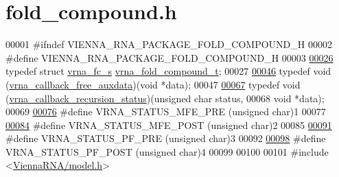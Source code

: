\hypertarget{fold__compound_8h_source}{}\section{fold\+\_\+compound.\+h}
\label{fold__compound_8h_source}

\begin{DoxyCode}
00001 \textcolor{preprocessor}{#ifndef VIENNA\_RNA\_PACKAGE\_FOLD\_COMPOUND\_H}
00002 \textcolor{preprocessor}{#define VIENNA\_RNA\_PACKAGE\_FOLD\_COMPOUND\_H}
00003 
\mbox{\hyperlink{group__fold__compound_ga1b0cef17fd40466cef5968eaeeff6166}{00026}} \textcolor{keyword}{typedef} \textcolor{keyword}{struct }\mbox{\hyperlink{group__fold__compound_structvrna__fc__s}{vrna\_fc\_s}} \mbox{\hyperlink{group__fold__compound_structvrna__fc__s}{vrna\_fold\_compound\_t}};
00027 
\mbox{\hyperlink{group__fold__compound_ga7806651f51b195013839a218b3bbd5a3}{00046}} \textcolor{keyword}{typedef} void (\mbox{\hyperlink{group__fold__compound_ga7806651f51b195013839a218b3bbd5a3}{vrna\_callback\_free\_auxdata}})(\textcolor{keywordtype}{void} *data);
00047 
\mbox{\hyperlink{group__fold__compound_gac86036fa8cad1108832335063243cdc8}{00067}} \textcolor{keyword}{typedef} void (\mbox{\hyperlink{group__fold__compound_gac86036fa8cad1108832335063243cdc8}{vrna\_callback\_recursion\_status}})(\textcolor{keywordtype}{unsigned} \textcolor{keywordtype}{char} status,
00068                                               \textcolor{keywordtype}{void}          *data);
00069 
\mbox{\hyperlink{group__fold__compound_ga1a5053dc8acbb0111e852988726f07d6}{00076}} \textcolor{preprocessor}{#define VRNA\_STATUS\_MFE\_PRE     (unsigned char)1}
00077 
\mbox{\hyperlink{group__fold__compound_ga47c900ca76e56e59e2e83a06e0bde641}{00084}} \textcolor{preprocessor}{#define VRNA\_STATUS\_MFE\_POST    (unsigned char)2}
00085 
\mbox{\hyperlink{group__fold__compound_ga91795d35ebdb6f32be50459f24b3d114}{00091}} \textcolor{preprocessor}{#define VRNA\_STATUS\_PF\_PRE      (unsigned char)3}
00092 
\mbox{\hyperlink{group__fold__compound_ga1c6fa243533fd026e50f7d595eaaa565}{00098}} \textcolor{preprocessor}{#define VRNA\_STATUS\_PF\_POST     (unsigned char)4}
00099 
00100 
00101 \textcolor{preprocessor}{#include <\mbox{\hyperlink{model_8h}{ViennaRNA/model.h}}>}

\end{DoxyCode}
